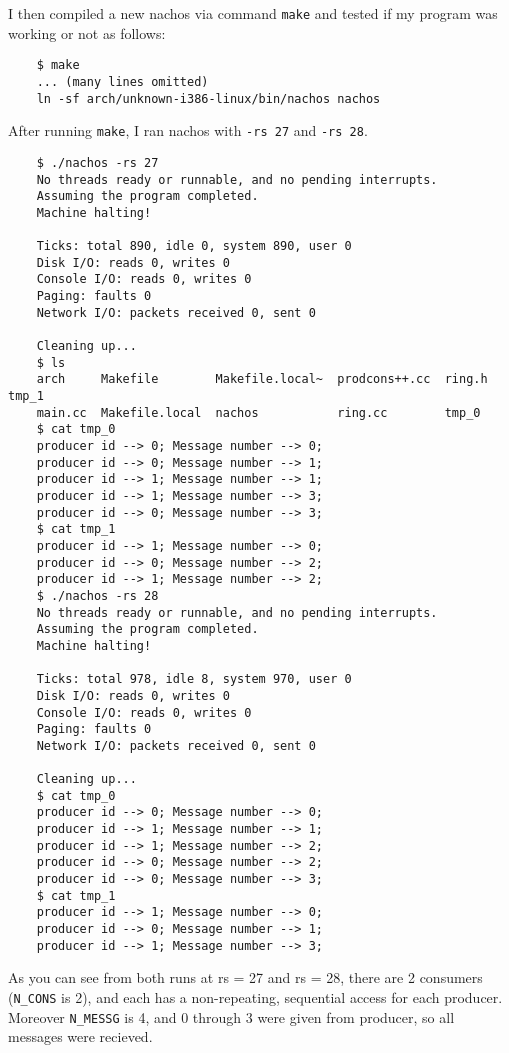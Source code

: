\documentclass[11pt]{article}
\begin{document}
    \begin{question}
        I then compiled a new nachos via command {\tt make} and tested if my program was working or not as follows:
        \begin{verbatim}
    $ make
    ... (many lines omitted)
    ln -sf arch/unknown-i386-linux/bin/nachos nachos
\end{verbatim}
        After running {\tt make}, I ran nachos with {\tt -rs 27} and {\tt -rs 28}.
\begin{verbatim}
    $ ./nachos -rs 27
    No threads ready or runnable, and no pending interrupts.
    Assuming the program completed.
    Machine halting!

    Ticks: total 890, idle 0, system 890, user 0
    Disk I/O: reads 0, writes 0
    Console I/O: reads 0, writes 0
    Paging: faults 0
    Network I/O: packets received 0, sent 0

    Cleaning up...
    $ ls
    arch     Makefile        Makefile.local~  prodcons++.cc  ring.h  tmp_1
    main.cc  Makefile.local  nachos           ring.cc        tmp_0
    $ cat tmp_0
    producer id --> 0; Message number --> 0;
    producer id --> 0; Message number --> 1;
    producer id --> 1; Message number --> 1;
    producer id --> 1; Message number --> 3;
    producer id --> 0; Message number --> 3;
    $ cat tmp_1
    producer id --> 1; Message number --> 0;
    producer id --> 0; Message number --> 2;
    producer id --> 1; Message number --> 2;
    $ ./nachos -rs 28
    No threads ready or runnable, and no pending interrupts.
    Assuming the program completed.
    Machine halting!

    Ticks: total 978, idle 8, system 970, user 0
    Disk I/O: reads 0, writes 0
    Console I/O: reads 0, writes 0
    Paging: faults 0
    Network I/O: packets received 0, sent 0

    Cleaning up...
    $ cat tmp_0
    producer id --> 0; Message number --> 0;
    producer id --> 1; Message number --> 1;
    producer id --> 1; Message number --> 2;
    producer id --> 0; Message number --> 2;
    producer id --> 0; Message number --> 3;
    $ cat tmp_1
    producer id --> 1; Message number --> 0;
    producer id --> 0; Message number --> 1;
    producer id --> 1; Message number --> 3;
        \end{verbatim}

        As you can see from both runs at rs = 27 and rs = 28, there are 2 consumers ({\tt N\_CONS} is 2), and each has a non-repeating, sequential access for each producer. Moreover {\tt N\_MESSG} is 4, and 0 through 3 were given from producer, so all messages were recieved.
    \end{question}
\end{document}
